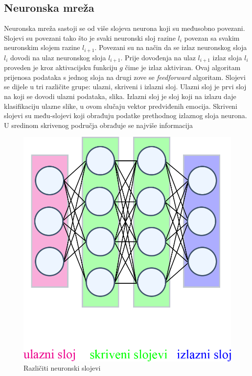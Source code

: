 \documentclass[times, utf8, zavrsni,numeric,pstricks]{fer}
\begin{document}
\subsection{Neuronska mreža}



Neuronska mreža sastoji se od više slojeva neurona koji su međusobno povezani. Slojevi su povezani tako što je svaki neuronski sloj razine $l_i$ povezan sa svakim neuronskim slojem razine $l_{i+1}$. Povezani su na način da se izlaz neuronskog sloja $l_i$ dovodi na ulaz neuronskog sloja $l_{i+1}$. Prije dovođenja na ulaz $l_{i+1}$ izlaz sloja $l_i$ proveden je kroz aktivacijsku funkciju $g$ čime je izlaz aktiviran. Ovaj algoritam prijenosa podataka s jednog sloja na drugi zove se \textit{feedforward} algoritam. Slojevi se dijele u tri različite grupe: ulazni, skriveni i izlazni sloj. Ulazni sloj je prvi sloj na koji se dovodi ulazni podataka, slika. Izlazni sloj je sloj koji na izlazu daje klasifikaciju ulazne slike, u ovom slučaju vektor predviđenih emocija. Skriveni slojevi su među-slojevi koji obrađuju podatke prethodnog izlaznog sloja neurona. U sredinom skrivenog područja obrađuje se najviše informacija 

\begin{figure}[H]
	\centering
	\includegraphics[width=\linewidth, height=0.3\paperheight, keepaspectratio]{neuron_layers.png}
	\caption{Različiti neuronski slojevi}
	\label{pic:ck_example}
\end{figure}
\end{document}
